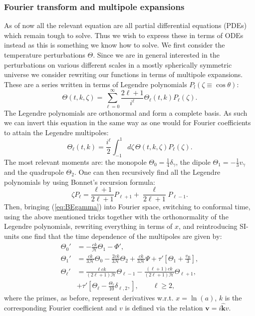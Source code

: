 \documentclass[%
reprint,
 amsmath,amssymb,
 aps,
]{revtex4-2}
\newcommand{\Hp}{\mathcal{H}}
\begin{document}
\subsubsection{Fourier transform and multipole expansions}
As of now all the relevant equation are all partial differential equations (PDEs) which remain tough to solve. Thus we wish to express these in terms of ODEs instead as this is something we know how to solve. We first consider the temperature perturbations $\Theta$. Since we are in general interested in the perturbations on various different scales in a mostly spherically symmetric universe we consider rewriting our functions in terms of multipole expansions. These are a series written in terms of Legendre polynomials $P_l(\zeta\equiv\cos\theta)$:
\[\Theta(t,k,\zeta)=\sum_{\ell=0}^\infty\frac{2\ell+1}{i^\ell}\Theta_\ell(t,k)P_\ell(\zeta).\]
The Legendre polynomials are orthonormal and form a complete basis. As such we can invert this equation in the same way as one would for Fourier coefficients to attain the Legendre multipoles:
\[\Theta_\ell(t,k)=\frac{i^\ell}{2}\int_{-1}^1d\zeta\, \Theta(t,k,\zeta)P_\ell(\zeta).\]
The most relevant moments are: the monopole $\Theta_0=\frac14\delta_\gamma$, the dipole $\Theta_1=-\frac13v_\gamma$ and the quadrupole $\Theta_2$. One can then recursively find all the Legendre polynomials by using Bonnet's recursion formula:
\[\zeta P_\ell=\frac{\ell+1}{2\ell+1}P_{\ell+1}+\frac{\ell}{2\ell+1}P_{\ell-1}.\]
Then, bringing (\ref{eq:BEgamma}) into Fourier space, switching to conformal time, using the above mentioned tricks together with the orthonormality of the Legendre polynomials, rewriting everything in terms of $x$, and reintroducing SI-units one find that the time dependence of the multipoles are given by:
\begin{align*}
	\Theta_0'&=-\frac{ck}{\Hp}\Theta_1-\Phi',\\
	\Theta_1'&=\frac{ck}{3\Hp}\Theta_0-\frac{2ck}{3\Hp}\Theta_2+\frac{ck}{3\Hp}\Psi+\tau'\left[\Theta_1+\frac{v_\text{B}}{3}\right],\\
	\Theta_\ell'&=\frac{\ell ck}{(2\ell+1)\Hp}\Theta_{\ell-1}-\frac{(\ell+1)ck}{(2\ell+1)\Hp}\Theta_{\ell+1},\\
	&+\tau'\left[\Theta_\ell-\frac{\Theta_\ell}{10}\delta_{\ell,2},\right],\quad\quad\ell\geq2,
\end{align*}
where the primes, as before, represent derivatives w.r.t. $x=\ln(a)$, $k$ is the corresponding Fourier coefficient and $v$ is defined via the relation $\textbf{v}=i\hat{\textbf{k}}v$.
\end{document}
